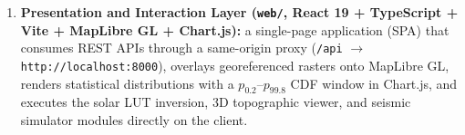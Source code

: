 \documentclass[11pt,a4paper]{article}
\newcommand{\src}[1]{\nolinkurl{#1}}
\begin{document}
\begin{enumerate}
        persistent volume (\texttt{pgdata}). Heavy raster products ($32\text{-bit}$ GeoTIFF/COG files and visual
        PNGs) are stored in immutable hash-indexed disk hierarchies (, ,
        , , and ).
  \item \textbf{Presentation and Interaction Layer (\src{web/}, React 19 + TypeScript + Vite + MapLibre GL + Chart.js):}
        a single-page application (SPA) that consumes REST APIs through a same-origin proxy
        (\texttt{/api} $\to$ \texttt{http://localhost:8000}), overlays georeferenced rasters onto MapLibre GL,
        renders statistical distributions with a $p_{0.2}\text{--}p_{99.8}$ CDF window in Chart.js, and executes
        the solar LUT inversion, 3D topographic viewer, and seismic simulator modules directly on the client.
\end{enumerate}
\end{document}
